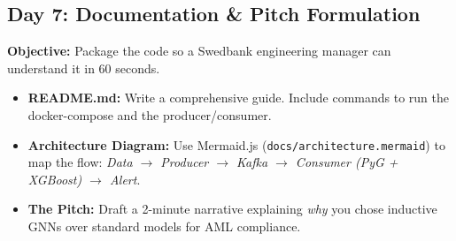 \documentclass[12pt,a4paper]{article}
\newcommand{\todo}{\ding{113}}
\begin{document}
\subsection{Day 7: Documentation \& Pitch Formulation}
\textbf{Objective:} Package the code so a Swedbank engineering manager can understand it in 60 seconds.

\begin{itemize}
    \item[\todo] \textbf{README.md:} Write a comprehensive guide. Include commands to run the docker-compose and the producer/consumer.
    \item[\todo] \textbf{Architecture Diagram:} Use Mermaid.js (\texttt{docs/architecture.mermaid}) to map the flow: \textit{Data $\rightarrow$ Producer $\rightarrow$ Kafka $\rightarrow$ Consumer (PyG + XGBoost) $\rightarrow$ Alert}.
    \item[\todo] \textbf{The Pitch:} Draft a 2-minute narrative explaining \textit{why} you chose inductive GNNs over standard models for AML compliance.
\end{itemize}
\end{document}
